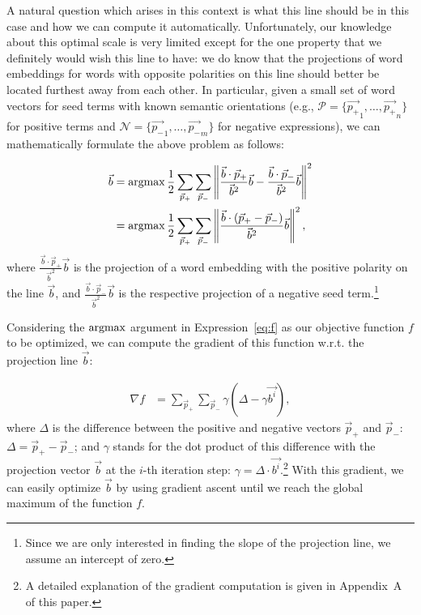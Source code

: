 A natural question which arises in this context is what this line
should be in this case and how we can compute it automatically.
Unfortunately, our knowledge about this optimal scale is very limited
except for the one property that we definitely would wish this line to
have: we do know that the projections of word embeddings for words
with opposite polarities on this line should better be located
furthest away from each other.  In particular, given a small set of
word vectors for seed terms with known semantic orientations (e.g.,
$\mathcal{P} = \{\vec{p_+}_1,\ldots,\vec{p_+}_n\}$ for positive terms
and $\mathcal{N} = \{\vec{p_-}_1,\ldots,\vec{p_-}_m\}$ for negative
expressions), we can mathematically formulate the above problem as
follows:

{\small%
\begin{align}
  \small
  \vec{b} &=\argmax\frac{1}{2}\sum_{\vec{p}_+}\sum_{\vec{p}_-}%
  \left\lVert\frac{\vec{b}\cdot\vec{p}_+}{\vec{b}^2}\vec{b}%
  - \frac{\vec{b}\cdot\vec{p}_-}{\vec{b}^2}\vec{b}\right\rVert^2\\
  &=\argmax\frac{1}{2}\sum_{\vec{p}_+}\sum_{\vec{p}_-}\left\lVert\frac{\vec{b}%
    \cdot\left(\vec{p}_{+}-\vec{p}_{-}\right)}{\vec{b}^2}\vec{b}\right\rVert^2,\label{eq:f}%
\end{align}\normalsize}%
where $\frac{\vec{b}\cdot\vec{p}_+}{\vec{b}^2}\vec{b}$ is the
projection of a word embedding with the positive polarity on the line
$\vec{b}$, and $\frac{\vec{b}\cdot\vec{p}_-}{\vec{b}^2}\vec{b}$ is the
respective projection of a negative seed term.\footnote{Since we are
  only interested in finding the slope of the projection line, we
  assume an intercept of zero.}

Considering the $\argmax$ argument in Expression~\ref{eq:f} as our
objective function $f$ to be optimized, we can compute the gradient of
this function w.r.t. the projection line $\vec{b}$:

{\small%
  \begin{align}
    \nabla f &= \sum_{\vec{p}_+}\sum_{\vec{p}_-}%
    \gamma\left(\Delta - \gamma\vec{b^{i}}\right),\label{eq:prj-line-grad}%
\end{align}\normalsize}%
where $\Delta$ is the difference between the positive and negative
vectors $\vec{p}_{+}$ and $\vec{p}_{-}$: $\Delta =
\vec{p}_{+}-\vec{p}_{-}$; and $\gamma$ stands for the dot product of
this difference with the projection vector $\vec{b}$ at the $i$-th
iteration step: $\gamma = \Delta \cdot \vec{b^i}$.\footnote{A detailed
  explanation of the gradient computation is given in Appendix~A of
  this paper.} With this gradient, we can easily optimize $\vec{b}$ by
using gradient ascent until we reach the global maximum of the
function $f$.

